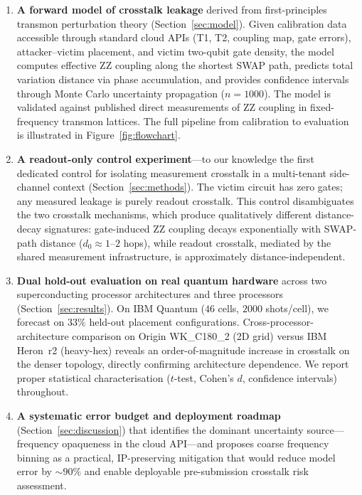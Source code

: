 \documentclass[ASNA,twocolumn]{USG}
\begin{document}
\begin{enumerate}
    \item \textbf{A forward model of crosstalk leakage} derived from first-principles transmon perturbation theory (Section~\ref{sec:model}). Given calibration data accessible through standard cloud APIs (T1, T2, coupling map, gate errors), attacker--victim placement, and victim two-qubit gate density, the model computes effective ZZ coupling along the shortest SWAP path, predicts total variation distance via phase accumulation, and provides confidence intervals through Monte Carlo uncertainty propagation ($n=1000$). The model is validated against published direct measurements of ZZ coupling in fixed-frequency transmon lattices. The full pipeline from calibration to evaluation is illustrated in Figure~\ref{fig:flowchart}.

    \item \textbf{A readout-only control experiment}---to our knowledge the first dedicated control for isolating measurement crosstalk in a multi-tenant side-channel context (Section~\ref{sec:methods}). The victim circuit has zero gates; any measured leakage is purely readout crosstalk. This control disambiguates the two crosstalk mechanisms, which produce qualitatively different distance-decay signatures: gate-induced ZZ coupling decays exponentially with SWAP-path distance ($d_0 \approx 1$--$2$ hops), while readout crosstalk, mediated by the shared measurement infrastructure, is approximately distance-independent.

    \item \textbf{Dual hold-out evaluation on real quantum hardware} across two superconducting processor architectures and three processors (Section~\ref{sec:results}). On IBM Quantum ($46$ cells, $2000$ shots/cell), we forecast on $33\%$ held-out placement configurations. Cross-processor-architecture comparison on Origin WK\_C180\_2 (2D grid) versus IBM Heron~r2 (heavy-hex) reveals an order-of-magnitude increase in crosstalk on the denser topology, directly confirming architecture dependence. We report proper statistical characterisation ($t$-test, Cohen's $d$, confidence intervals) throughout.

    \item \textbf{A systematic error budget and deployment roadmap} (Section~\ref{sec:discussion}) that identifies the dominant uncertainty source---frequency opaqueness in the cloud API---and proposes coarse frequency binning as a practical, IP-preserving mitigation that would reduce model error by $\sim 90\%$ and enable deployable pre-submission crosstalk risk assessment.
\end{enumerate}
\end{document}
